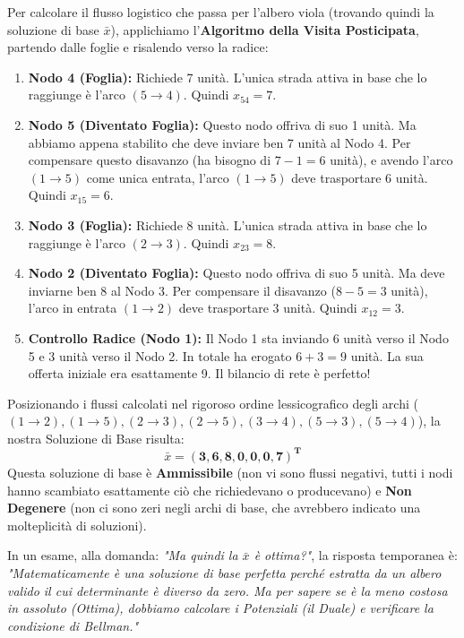\documentclass[12pt, a4paper]{article}
\begin{document}
	Per calcolare il flusso logistico che passa per l'albero viola (trovando quindi la soluzione di base $\bar{x}$), applichiamo l'\textbf{Algoritmo della Visita Posticipata}, partendo dalle foglie e risalendo verso la radice:
	\begin{enumerate}
		\item \textbf{Nodo 4 (Foglia):} Richiede 7 unità. L'unica strada attiva in base che lo raggiunge è l'arco $(5\to4)$. Quindi $x_{54} = 7$.
		\item \textbf{Nodo 5 (Diventato Foglia):} Questo nodo offriva di suo 1 unità. Ma abbiamo appena stabilito che deve inviare ben 7 unità al Nodo 4. Per compensare questo disavanzo (ha bisogno di $7-1=6$ unità), e avendo l'arco $(1\to5)$ come unica entrata, l'arco $(1\to5)$ deve trasportare 6 unità. Quindi $x_{15} = 6$.
		\item \textbf{Nodo 3 (Foglia):} Richiede 8 unità. L'unica strada attiva in base che lo raggiunge è l'arco $(2\to3)$. Quindi $x_{23} = 8$.
		\item \textbf{Nodo 2 (Diventato Foglia):} Questo nodo offriva di suo 5 unità. Ma deve inviarne ben 8 al Nodo 3. Per compensare il disavanzo ($8-5=3$ unità), l'arco in entrata $(1\to2)$ deve trasportare 3 unità. Quindi $x_{12} = 3$.
		\item \textbf{Controllo Radice (Nodo 1):} Il Nodo 1 sta inviando 6 unità verso il Nodo 5 e 3 unità verso il Nodo 2. In totale ha erogato $6+3=9$ unità. La sua offerta iniziale era esattamente 9. Il bilancio di rete è perfetto!
	\end{enumerate}
	
	Posizionando i flussi calcolati nel rigoroso ordine lessicografico degli archi ($(1\to2), (1\to5), (2\to3), (2\to5), (3\to4), (5\to3), (5\to4)$), la nostra Soluzione di Base risulta:
	\[
	\bar{x} = \mathbf{(3, 6, 8, 0, 0, 0, 7)^T}
	\]
	Questa soluzione di base è \textbf{Ammissibile} (non vi sono flussi negativi, tutti i nodi hanno scambiato esattamente ciò che richiedevano o producevano) e \textbf{Non Degenere} (non ci sono zeri negli archi di base, che avrebbero indicato una molteplicità di soluzioni). 
	
	In un esame, alla domanda: \textit{"Ma quindi la $\bar{x}$ è ottima?"}, la risposta temporanea è: \textit{"Matematicamente è una soluzione di base perfetta perché estratta da un albero valido il cui determinante è diverso da zero. Ma per sapere se è la meno costosa in assoluto (Ottima), dobbiamo calcolare i Potenziali (il Duale) e verificare la condizione di Bellman."}
	
\end{document}
